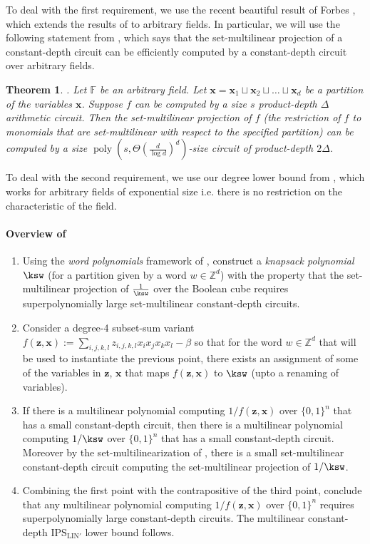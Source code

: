 \documentclass[11pt]{article}
\newtheorem{theorem}{Theorem}[section]
\newcommand{\poly}{\mathop{\mathrm{poly}}}
\newcommand{\Boo}{\{0,1 \}}
\newcommand{\F}{\mathbb{F}}
\newcommand{\IPSLINp}{\mathrm{IPS}_{\mathrm{LIN}'}}
\begin{document}
To deal with the first requirement, we use the recent beautiful result of Forbes \cite{Forbes-LST-CCC}, which extends the results of \cite{LST} to arbitrary fields. In particular, we will use the following statement from \cite{Forbes-LST-CCC}, which says that the set-multilinear projection of a constant-depth circuit can be efficiently computed by a constant-depth circuit over arbitrary fields. 
\begin{theorem}
   \cite[Corollary 27]{Forbes-LST-CCC}. Let $\F$ be an arbitrary field. Let $\mathbf{x} = \mathbf{x}_1 \sqcup \mathbf{x}_2 \sqcup \dots \sqcup \mathbf{x}_d$ be a partition of the variables $\mathbf{x}$. Suppose $f$ can be computed by a size $s$ product-depth $\Delta$ arithmetic circuit. Then the set-multilinear projection of $f$ (the restriction of $f$ to monomials that are set-multilinear with respect to the specified partition) can be computed by a size $\poly(s,\Theta(\frac{d}{\log d})^d)$-size circuit of product-depth $2\Delta$. 
\end{theorem}

To deal with the second requirement, we use our degree lower bound from , which works for arbitrary fields of exponential size i.e. there is no restriction on the characteristic of the field. 

\paragraph{Overview of \cite{GHT}}

\begin{enumerate}
    \item Using the \emph{word polynomials} framework of \cite{LST}, construct a \emph{knapsack polynomial} $\ksw$ (for a partition given by a word $w \in \mathbb{Z}^d$) with the property that the set-multilinear projection of $\frac{1}{\ksw}$ over the Boolean cube requires superpolynomially large set-multilinear constant-depth circuits.
    \item Consider a degree-4 subset-sum variant $f(\mathbf{z},\mathbf{x}) := \sum_{i,j,k,l}z_{i,j,k,l}x_ix_jx_kx_l - \beta$ so that for the word $w\in \mathbb{Z}^d$ that will be used to instantiate the previous point, there exists an assignment of some of the variables in $\mathbf{z}$, $\mathbf{x}$ that maps $f(\mathbf{z},\mathbf{x})$ to $\ksw$ (upto a renaming of variables).
    \item If there is a multilinear polynomial computing $1/f(\mathbf{z},\mathbf{x})$ over $\Boo^n$ that has a small constant-depth circuit, then there is a multilinear polynomial computing $1/\ksw$ over $\Boo^n$ that has a small constant-depth circuit. Moreover by the set-multilinearization of \cite{LST}, there is a small set-multilinear constant-depth circuit computing the set-multilinear projection of $1/\ksw$. 
    \item Combining the first point with the contrapositive of the third point, conclude that any multilinear polynomial computing $1/f(\mathbf{z},\mathbf{x})$ over $\Boo^n$ requires superpolynomially large constant-depth circuits. The multilinear constant-depth $\IPSLINp$ lower bound follows.
\end{enumerate}
\end{document}
